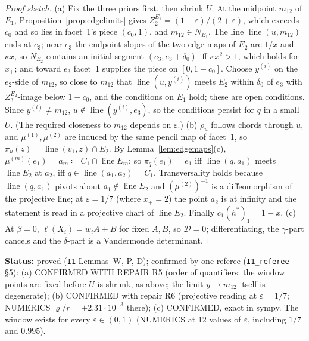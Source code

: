 \documentclass[11pt]{article}
\theoremstyle{definition}
\theoremstyle{remark}
\newcommand{\lin}{\operatorname{line}}
\newcommand{\src}[1]{\texttt{#1}}
\newcommand{\status}[1]{\par\smallskip\noindent\textbf{Status:} #1\par\smallskip}
\begin{document}
\begin{proof}[Proof sketch]
(a) Fix the three priors first, then shrink $U$. At the midpoint $m_{12}$ of $E_1$, Proposition~\ref{prop:edgelimits} gives $Z^{E_1}_2=(1-\varepsilon)/(2+\varepsilon)$, which exceeds $c_0$ and so lies in facet~1's piece $(c_0,1)$, and $m_{12}\in N_{E_1}$. The line $\lin(u,m_{12})$ ends at $e_3$; near $e_3$ the endpoint slopes of the two edge maps of $E_2$ are $1/x$ and $\kappa x$, so $N_{E_2}$ contains an initial segment $(e_3,e_3+\delta_0)$ iff $\kappa x^2>1$, which holds for $x_+$; and toward $e_3$ facet~1 supplies the piece on $[0,1-c_0]$. Choose $y^{(i)}$ on the $e_2$-side of $m_{12}$, so close to $m_{12}$ that $\lin(u,y^{(i)})$ meets $E_2$ within $\delta_0$ of $e_3$ with $Z^{E_2}_3$-image below $1-c_0$, and the conditions on $E_1$ hold; these are open conditions. Since $y^{(i)}\ne m_{12}$, $u\notin\lin(y^{(i)},e_3)$, so the conditions persist for $q$ in a small $U$. (The required closeness to $m_{12}$ depends on $\varepsilon$.) (b) $\rho_u$ follows chords through $u$, and $\mu^{(1)},\mu^{(2)}$ are induced by the same pencil map of facet~1, so $\pi_u(z)=\lin(v_1,z)\cap E_2$. By Lemma~\ref{lem:edgemaps}(c), $\mu^{(m)}(e_1)=a_m\coloneqq C_1\cap\lin E_m$; so $\pi_q(e_1)=e_1$ iff $\lin(q,a_1)$ meets $\lin E_2$ at $a_2$, iff $q\in\lin(a_1,a_2)=C_1$. Transversality holds because $\lin(q,a_1)$ pivots about $a_1\notin\lin E_2$ and $(\mu^{(2)})^{-1}$ is a diffeomorphism of the projective line; at $\varepsilon=1/7$ (where $x_+=2$) the point $a_2$ is at infinity and the statement is read in a projective chart of $\lin E_2$. Finally $c_1(h^*)_1=1-x$. (c) At $\beta=0$, $\ell(X_i)=w_iA+B$ for fixed $A,B$, so $\mathcal D=0$; differentiating, the $\gamma$-part cancels and the $\delta$-part is a Vandermonde determinant.
\end{proof}
\status{proved (\src{I1} Lemmas~W, P, D); confirmed by one referee (\src{I1\_referee} \S5): (a) CONFIRMED WITH REPAIR R5 (order of quantifiers: the window points are fixed before $U$ is shrunk, as above; the limit $y\to m_{12}$ itself is degenerate); (b) CONFIRMED with repair R6 (projective reading at $\varepsilon=1/7$; NUMERICS $\varrho/r=\pm2.31\cdot10^{-3}$ there); (c) CONFIRMED, exact in sympy. The window exists for every $\varepsilon\in(0,1)$ (NUMERICS at 12 values of $\varepsilon$, including $1/7$ and $0.995$).}
\end{document}

